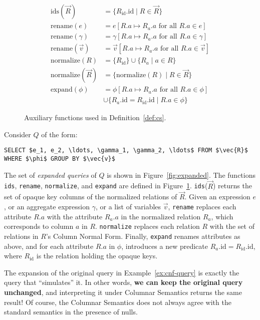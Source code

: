 \documentclass[sigconf]{acmart}
\begin{document}
\begin{figure}
\begin{align*}
\text{ids}(\vec{R}) &= \{ R_\text{id}.\text{id} \mid R \in \vec{R} \} \\
\text{rename}(e) &= e[R.a \mapsto R_a.a \text{ for all } R.a \in e] \\
\text{rename}(\gamma) &= \gamma[R.a \mapsto R_a.a \text{ for all } R.a \in \gamma] \\
\text{rename}(\vec{v}) &= \vec{v}[R.a \mapsto R_a.a \text{ for all } R.a \in \vec{v}] \\
\text{normalize}(R) &= \{ R_\text{id} \} \cup \{ R_a \mid a \in R \} \\
\text{normalize}(\vec{R}) &= \{ \text{normalize}(R) \mid R \in \vec{R} \} \\
\text{expand}(\phi) &= \phi[R.a \mapsto R_a.a \text{ for all } R.a \in \phi] \\
&\cup \{ R_a.\text{id} = R_\text{id}.\text{id} \mid R.a \in \phi \}
\end{align*}
\caption{Auxiliary functions used in Definition~\ref{def:cs}.}
\label{fig:aux}
\end{figure}

\begin{definition}
\label{def:cs}  
Consider $Q$ of the form:
%
\begin{lstlisting}
SELECT $e_1, e_2, \ldots, \gamma_1, \gamma_2, \ldots$ FROM $\vec{R}$ WHERE $\phi$ GROUP BY $\vec{v}$
\end{lstlisting}
%
The set of {\em expanded queries} of $Q$ is shown in Figure~\ref{fig:expanded}.
The functions \lstinline|ids|, 
 \lstinline|rename|, 
 \lstinline|normalize|, and \lstinline|expand| 
 are defined in Figure~\ref{fig:aux}.
\lstinline|ids|($\vec{R}$) returns the set of opaque key columns
 of the normalized relations of $\vec{R}$.
Given an expression $e$, or an aggregate expression $\gamma$,
 or a list of variables $\vec{v}$, 
 \lstinline|rename| replaces each attribute $R.a$ 
 with the attribute $R_a.a$ 
 in the normalized relation $R_a$, 
 which corresponds to column $a$ in $R$.
\lstinline|normalize| replaces each relation $R$ 
 with the set of relations in $R$'s Column Normal Form.
Finally, \lstinline|expand| renames attributes as above, 
 and for each attribute $R.a$ in $\phi$, 
 introduces a new predicate $R_a.\text{id} = R_\text{id}.\text{id}$,
 where $R_\text{id}$ is the relation holding the opaque keys.
\end{definition}

\begin{example}
\label{ex:cs}
The expansion of the original query in Example~\ref{ex:cnf-query} is
 exactly the query that ``simulates'' it.
In other words, \textbf{we can keep the original query unchanged},
 and interpreting it under Columnar Semantics
 returns the same result!
Of course, the Columnar Semantics does not 
 always agree with the standard semantics
 in the presence of nulls.
\end{example}
\end{document}
